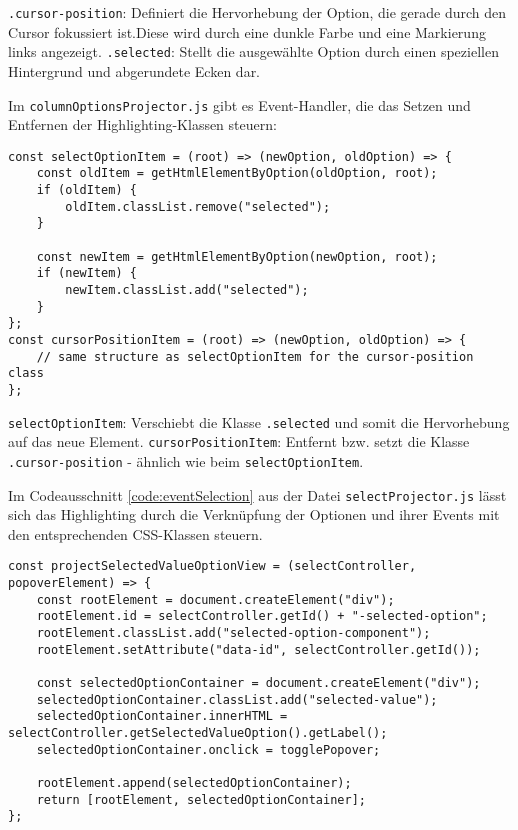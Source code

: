\texttt{.cursor-position}: Definiert die Hervorhebung der Option, die gerade durch den Cursor fokussiert ist.Diese wird durch eine dunkle Farbe und eine Markierung links angezeigt.
\texttt{.selected}: Stellt die ausgewählte Option durch einen speziellen Hintergrund und abgerundete Ecken dar.

Im \texttt{columnOptionsProjector.js} gibt es Event-Handler, die das Setzen und Entfernen der Highlighting-Klassen steuern:

\begin{lstlisting}[style = htmlcssjs, caption = Steurung der Highlighting-Klassen, label = code:highlightChange]
const selectOptionItem = (root) => (newOption, oldOption) => {
    const oldItem = getHtmlElementByOption(oldOption, root);
    if (oldItem) {
        oldItem.classList.remove("selected");
    }

    const newItem = getHtmlElementByOption(newOption, root);
    if (newItem) {
        newItem.classList.add("selected");
    }
}; 
const cursorPositionItem = (root) => (newOption, oldOption) => {
    // same structure as selectOptionItem for the cursor-position class
}; 
\end{lstlisting}

\texttt{selectOptionItem}: Verschiebt die Klasse \texttt{.selected} und somit die Hervorhebung auf das neue Element.
\texttt{cursorPositionItem}: Entfernt bzw. setzt die Klasse \texttt{.cursor-position} - ähnlich wie beim \texttt{selectOptionItem}. 

Im Codeausschnitt \ref{code:eventSelection} aus der Datei \texttt{selectProjector.js} lässt sich das Highlighting 
durch die Verknüpfung der Optionen und ihrer Events mit den entsprechenden CSS-Klassen steuern.

\begin{lstlisting}[style = htmlcssjs, caption = Event-Handling für die Auswahl einer Option, label = code:eventSelection]
const projectSelectedValueOptionView = (selectController, popoverElement) => {
    const rootElement = document.createElement("div");
    rootElement.id = selectController.getId() + "-selected-option";
    rootElement.classList.add("selected-option-component");
    rootElement.setAttribute("data-id", selectController.getId());
    
    const selectedOptionContainer = document.createElement("div");
    selectedOptionContainer.classList.add("selected-value");
    selectedOptionContainer.innerHTML = selectController.getSelectedValueOption().getLabel();
    selectedOptionContainer.onclick = togglePopover;
    
    rootElement.append(selectedOptionContainer);
    return [rootElement, selectedOptionContainer];
}; 
\end{lstlisting}

